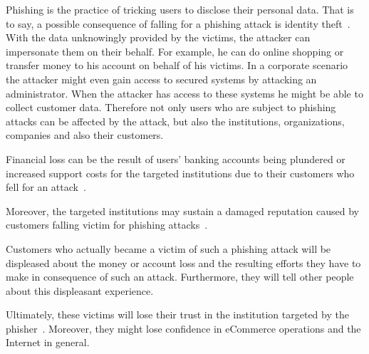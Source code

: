 \begin{description}[leftmargin=0cm]
	\item[Identity Theft] Phishing is the practice of tricking users to disclose their personal data.
 That is to say, a possible consequence of falling for a phishing attack is identity theft~\cite{jakobsson2006phishing}.
 With the data unknowingly provided by the victims, the attacker can impersonate them on their behalf.
 For example, he can do online shopping or transfer money to his account on behalf of his victims.
 In a corporate scenario the attacker might even gain access to secured systems by attacking an administrator.
 When the attacker has access to these systems he might be able to collect customer data.
 Therefore not only users who are subject to phishing attacks can be affected by the attack, but also the institutions, organizations, companies and also their customers.
	\item[Financial Loss] Financial loss can be the result of users' banking accounts being plundered or increased support costs for the targeted institutions due to their customers who fell for an attack~\cite{rsa2013, mcafee}.
	\item[Reputational Damage]  Moreover, the targeted institutions may sustain a damaged reputation caused by customers falling victim for phishing attacks~\cite{mcafee, redcondor}.
	\item[Displeased Customers]  Customers who actually became a victim of such a phishing attack will be displeased about the money or account loss and the resulting efforts they have to make in consequence of such an attack.
 Furthermore, they will tell other people about this displeasant experience.
	\item[Loss of Trust]  Ultimately, these victims will lose their trust in the institution targeted by the phisher~\cite{redcondor}.
 Moreover, they might lose confidence in eCommerce operations and the Internet in general.
\end{description}
 
 





